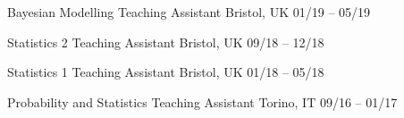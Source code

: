 


\begin{cvhonors}

	
    \cvhonor
    {Bayesian Modelling}
	{Teaching Assistant}
	{Bristol, UK}
	{01\slash 19 -- 05\slash 19}
	
    \cvhonor
    {Statistics 2}
	{Teaching Assistant}
	{Bristol, UK}
	{09\slash 18 -- 12\slash 18}
	
    \cvhonor
	{Statistics 1}
	{Teaching Assistant}
	{Bristol, UK}
	{01\slash 18 -- 05\slash 18}
	
    \cvhonor
	{Probability and Statistics}
	{Teaching Assistant}
	{Torino, IT}
	{09\slash 16 -- 01\slash 17}

\end{cvhonors}

	

	

	